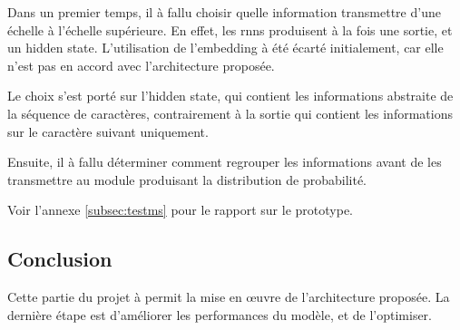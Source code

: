 \vspace{1em}
Dans un premier temps, il à fallu choisir quelle information transmettre d'une échelle à l'échelle supérieure. En effet, les \glspl{rnn} produisent à la fois une sortie, et un \gls{hidden state}. L'utilisation de l'\gls{embedding} à été écarté initialement, car elle n'est pas en accord avec l'architecture proposée.

Le choix s'est porté sur l'\gls{hidden state}, qui contient les informations abstraite de la séquence de caractères, contrairement à la sortie qui contient les informations sur le caractère suivant uniquement.

Ensuite, il à fallu déterminer comment regrouper les informations avant de les transmettre au module produisant la distribution de probabilité.


Voir l'annexe \ref{subsec:testms} pour le rapport sur le prototype. 

\subsection{Conclusion}
Cette partie du projet à permit la mise en œuvre de l'architecture proposée. La dernière étape est d'améliorer les performances du modèle, et de l'optimiser.
